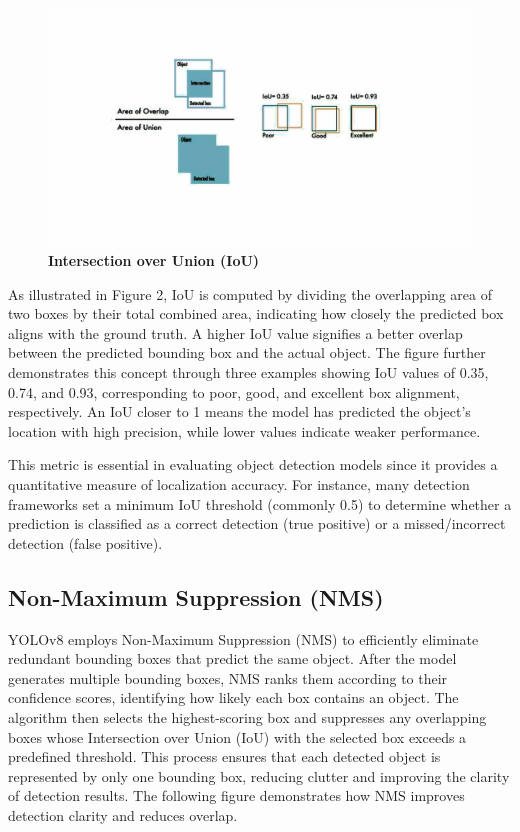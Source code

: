 \begin{refsection}
\begin{figure}[H]
    \centering
    \includegraphics[width=1\textwidth]{figures/Fig 2.jpg}
    \caption{\textbf{Intersection over Union (IoU)}}
    \label{figures/Fig 2.jpg}
\end{figure}

As illustrated in Figure 2, IoU is computed by dividing the overlapping area of two boxes by their total combined area, indicating how closely the predicted box aligns with the ground truth. A higher IoU value signifies a better overlap between the predicted bounding box and the actual object. The figure further demonstrates this concept through three examples showing IoU values of 0.35, 0.74, and 0.93, corresponding to poor, good, and excellent box alignment, respectively. An IoU closer to 1 means the model has predicted the object’s location with high precision, while lower values indicate weaker performance. \cite{Terven2023}

This metric is essential in evaluating object detection models since it provides a quantitative measure of localization accuracy. For instance, many detection frameworks set a minimum IoU threshold (commonly 0.5) to determine whether a prediction is classified as a correct detection (true positive) or a missed/incorrect detection (false positive).


\subsection*{Non-Maximum Suppression (NMS)}

YOLOv8 employs Non-Maximum Suppression (NMS) to efficiently eliminate redundant bounding boxes that predict the same object. After the model generates multiple bounding boxes, NMS ranks them according to their confidence scores, identifying how likely each box contains an object. The algorithm then selects the highest-scoring box and suppresses any overlapping boxes whose Intersection over Union (IoU) with the selected box exceeds a predefined threshold. This process ensures that each detected object is represented by only one bounding box, reducing clutter and improving the clarity of detection results. 
The following figure demonstrates how NMS improves detection clarity and reduces overlap.


\end{refsection}
